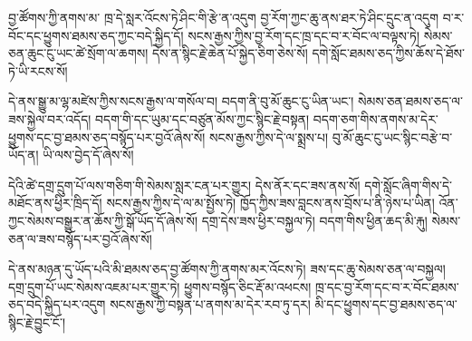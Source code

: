 \documentclass[12pt]{nextbook}
\begin{document}
\begin{readersection}{བྱ་ཚོགས་ཀྱི་ནགས་མ་}
ཁྲ་དེ་སླར་འོངས་ཏེ་ཤིང་གི་རྩེ་ན་འདུག བྱ་རོག་ཀྱང་ཆུ་ནས་ཐར་ཏེ་ཤིང་དྲུང་ན་འདུག བ་ར་བོང་དང་ཕྱུགས་ཐམས་ཅད་ཀྱང་བདེ་སྐྱིད་དོ། སངས་རྒྱས་ཀྱིས་བྱ་རོག་དང་ཁྲ་དང་བ་ར་བོང་ལ་བལྟས་ཏེ། སེམས་ཅན་ཆུང་ངུ་ཡང་ཚེ་སྲོག་ལ་ཆགས། དེས་ན་སྙིང་རྗེ་ཆེན་པོ་སྐྱེད་ཅིག་ཅེས་སོ། དགེ་སློང་ཐམས་ཅད་ཀྱིས་ཆོས་དེ་ཐོས་ཏེ་ཡི་རངས་སོ།

དེ་ནས་སྒྱུ་མ་ལྷ་མཛེས་ཀྱིས་སངས་རྒྱས་ལ་གསོལ་བ། བདག་ནི་བུ་མོ་ཆུང་ངུ་ཡིན་ཡང་། སེམས་ཅན་ཐམས་ཅད་ལ་ཟས་སྐྱེལ་བར་འདོད། བདག་གི་དང་ཡུམ་དང་བཙུན་མོས་ཀྱང་སྙིང་རྗེ་བསྟན། བདག་ཅག་གིས་ནགས་མ་དེར་ཕྱུགས་དང་བྱ་ཐམས་ཅད་བསྙོད་པར་བྱའོ་ཞེས་སོ། སངས་རྒྱས་ཀྱིས་དེ་ལ་སྨྲས་པ། བུ་མོ་ཆུང་ངུ་ཡང་སྙིང་བརྩེ་བ་ཡོད་ན། ཡི་ལས་བྱེད་དོ་ཞེས་སོ།

དེའི་ཚེ་དགྲ་དྲུག་པོ་ལས་གཅིག་གི་སེམས་སླར་ངན་པར་གྱུར། དེས་ནོར་དང་ཟས་ནས་སོ། དགེ་སློང་ཞིག་གིས་དེ་མཐོང་ནས་ཕྱིར་ཁྲིད་དོ། སངས་རྒྱས་ཀྱིས་དེ་ལ་མ་སྤྱོས་ཏེ། ཁྱོད་ཀྱིས་ཟས་བླངས་ནས་བྲོས་པ་ནི་ཉེས་པ་ཡིན། འོན་ཀྱང་སེམས་བསྒྱུར་ན་ཆོས་ཀྱི་སྒོ་ཡོད་དོ་ཞེས་སོ། དགྲ་དེས་ཟས་ཕྱིར་བསྐྱལ་ཏེ། བདག་གིས་ཕྱིན་ཆད་མི་རྐུ། སེམས་ཅན་ལ་ཟས་བསྙོད་པར་བྱའོ་ཞེས་སོ།

དེ་ནས་མཉན་དུ་ཡོད་པའི་མི་ཐམས་ཅད་བྱ་ཚོགས་ཀྱི་ནགས་མར་འོངས་ཏེ། ཟས་དང་ཆུ་སེམས་ཅན་ལ་བསྐྱལ། དགྲ་དྲུག་པོ་ཡང་སེམས་འཇམ་པར་གྱུར་ཏེ། ཕྱུགས་བསྙོད་ཅིང་རྡོ་མ་འཕངས། ཁྲ་དང་བྱ་རོག་དང་བ་ར་བོང་ཐམས་ཅད་བདེ་སྐྱིད་པར་འདུག སངས་རྒྱས་ཀྱི་བསྟན་པ་ནགས་མ་དེར་རབ་ཏུ་དར། མི་དང་ཕྱུགས་དང་བྱ་ཐམས་ཅད་ལ་སྙིང་རྗེ་བྱུང་ངོ་།
\end{readersection}
\end{document}
